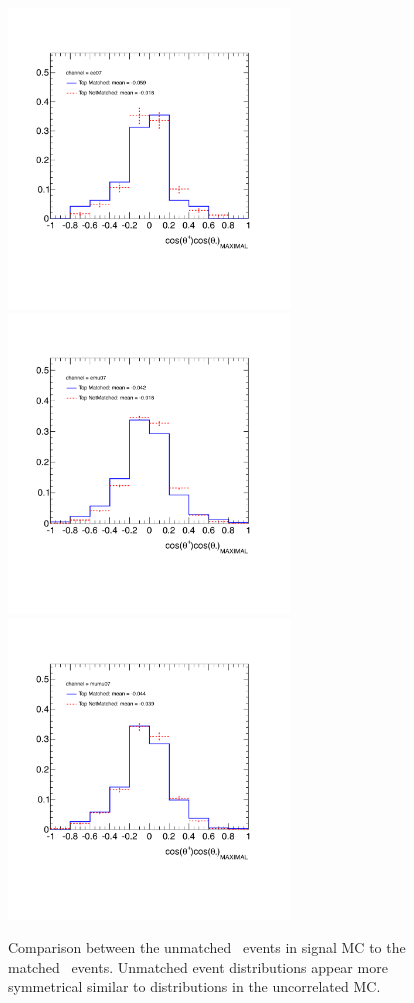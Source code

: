 \begin{figure}[htbp!]
	\begin{center}
	\includegraphics[width=75mm]{f/ee_coscosop_matching}
	\includegraphics[width=75mm]{f/emu_coscosop_matching}
	\includegraphics[width=75mm]{f/mumu_coscosop_matching}
	\end{center}
	\caption{Comparison between the unmatched \ttbar\ events in signal MC to the matched \ttbar\ events. Unmatched event distributions appear more symmetrical similar to distributions in the uncorrelated MC.}
	\label{fig:matching}
	\end{figure}


